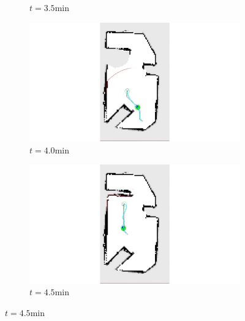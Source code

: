 \documentclass[11pt,professionalfonts,hyperref={pdftex,pdfpagemode=none,pdfstartview=FitH}]{beamer}
\begin{document}
\begin{frame}
\begin{figure}
{\begin{subfigure}[b]{0.19\textwidth}
        		\caption*{$t=3.5$min}
        		\label{fig:Experiment_ogm_t3p5}
    	\end{subfigure}
	\begin{subfigure}[b]{0.19\textwidth}
        		\includegraphics[trim={13cm 1cm 13cm 0}, clip, width=\textwidth]{t_4min.jpg}
        		\caption*{$t=4.0$min}
        		\label{fig:Experiment_ogm_t4}
    	\end{subfigure}
	\begin{subfigure}[b]{0.19\textwidth}
        		\includegraphics[trim={13cm 1cm 13cm 0}, clip, width=\textwidth]{t_4p5min.jpg}
        		\caption*{$t=4.5$min}
        		\label{fig:Experiment_ogm_t4p5}
    	\end{subfigure}
	}
\end{figure}

\end{frame}
\end{document}
